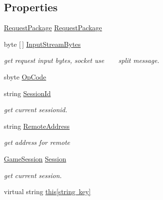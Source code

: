 \subsection*{Properties}
\begin{DoxyCompactItemize}
\item 
\mbox{\hyperlink{class_t_net_1_1_contract_1_1_request_package}{Request\+Package}} \mbox{\hyperlink{class_t_net_1_1_service_1_1_action_getter_a5838d501686d19cbe54a568159670ec3}{Request\+Package}}
\item 
byte \mbox{[}$\,$\mbox{]} \mbox{\hyperlink{class_t_net_1_1_service_1_1_action_getter_a8462fc5d535215ef6b36dbf106d1655f}{Input\+Stream\+Bytes}}
\begin{DoxyCompactList}\small\item\em get request input bytes, socket use \textquotesingle{}~\newline
~\newline
\textquotesingle{} split message. \end{DoxyCompactList}\item 
sbyte \mbox{\hyperlink{class_t_net_1_1_service_1_1_action_getter_a725d5f3ff850d7d5e7f90d7e25995e9c}{Op\+Code}}
\item 
string \mbox{\hyperlink{class_t_net_1_1_service_1_1_action_getter_aaf36821fc7d5cdb346f67dde5cbc4b42}{Session\+Id}}
\begin{DoxyCompactList}\small\item\em get current sessionid. \end{DoxyCompactList}\item 
string \mbox{\hyperlink{class_t_net_1_1_service_1_1_action_getter_aae8a367f3ed6d6e848236f7d10cfae39}{Remote\+Address}}
\begin{DoxyCompactList}\small\item\em get address for remote \end{DoxyCompactList}\item 
\mbox{\hyperlink{class_t_net_1_1_contract_1_1_game_session}{Game\+Session}} \mbox{\hyperlink{class_t_net_1_1_service_1_1_action_getter_a0799a03725a5b401980b221012355e7d}{Session}}
\begin{DoxyCompactList}\small\item\em get current session. \end{DoxyCompactList}\item 
virtual string \mbox{\hyperlink{class_t_net_1_1_service_1_1_action_getter_a39997125aeffb62813680d6d33583567}{this\mbox{[}string key\mbox{]}}}
\end{DoxyCompactItemize}


